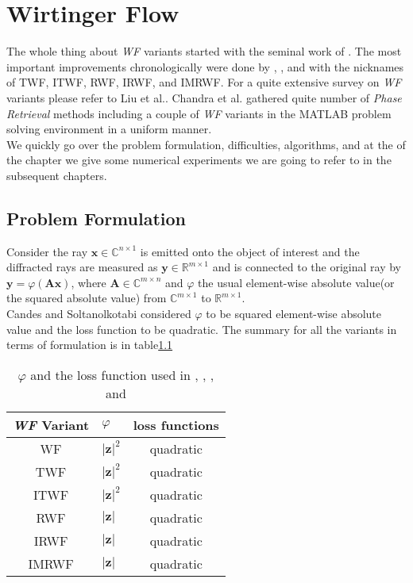 \chapter{Wirtinger Flow}

The whole thing about \emph{\ac{WF}} variants started with the seminal work of \cite{Candes2014}.
The most important improvements chronologically were done by \cite{Chen2015}, \cite{Kolte2016}, and\cite{Zhang2016}
with the nicknames of \ac{TWF}, \ac{ITWF}, \ac{RWF}, \ac{IRWF}, and \ac{IMRWF}.
For a quite extensive survey on \emph{\ac{WF}} variants please refer to Liu et al.\cite{Liu2019}. Chandra et al.\cite{Chandra2017} 
gathered quite number of \emph{Phase Retrieval} methods including a couple of \emph{\ac{WF}} variants in the MATLAB\textregistered\space 
problem solving environment in a uniform manner.\\
We quickly go over the problem formulation, difficulties, algorithms, and at the of the chapter we give some numerical experiments we are going
to refer to in the subsequent chapters.

\section{Problem Formulation}
Consider the ray $\boldsymbol{x} \in \mathbb{C}^{n \times 1}$ is emitted onto the object of interest and the diffracted rays are measured as 
$\boldsymbol{y} \in \mathbb{R}^{m \times 1}$ and is connected to the original ray by $\boldsymbol{y} = \varphi(\boldsymbol{A}\boldsymbol{x})$,
where $\boldsymbol{A} \in \mathbb{C}^{m \times n}$ and $\varphi$ the usual element-wise absolute value(or the squared absolute value) from 
$\mathbb{C}^{m \times 1}$ to $\mathbb{R}^{m \times 1}$.\\
Candes and Soltanolkotabi\cite{Candes2014} considered $\varphi$ to be squared element-wise absolute value and the loss function to be quadratic. 
The summary for all the variants in terms of formulation is in table\ref{tab:formulation}  


\begin{table}
	\centering
	\begin{tabular}{||c l c||} 
	 \hline
	 \emph{\ac{WF}} Variant & $\varphi$ 						& loss functions\\ [0.5ex] 
	 \hline\hline
	 \ac{WF}                & $\left|\boldsymbol{z}\right|^2$ 	& quadratic 	\\ 
	 \ac{TWF}   			& $\left|\boldsymbol{z}\right|^2$ 	& quadratic 	\\
	 \ac{ITWF}              & $\left|\boldsymbol{z}\right|^2$   & quadratic 	\\
	 \ac{RWF} 				& $\left|\boldsymbol{z}\right|$ 	& quadratic 	\\
	 \ac{IRWF} 	            & $\left|\boldsymbol{z}\right|$ 	& quadratic 	\\
	 \ac{IMRWF}             & $\left|\boldsymbol{z}\right|$ 	& quadratic 	\\ [1ex] 
	 \hline
	\end{tabular}
	\caption{$\varphi$ and the loss function used in \cite{Candes2014}, \cite{Chen2015}, \cite{Kolte2016}, and \cite{Zhang2016}}
	\label{tab:formulation}
	\end{table}
